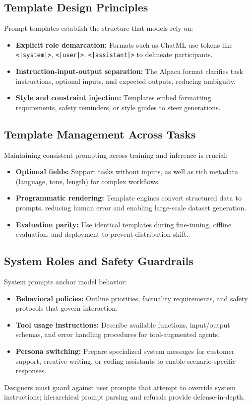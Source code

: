 \documentclass{article}
\begin{document}
\subsection{Template Design Principles}
Prompt templates establish the structure that models rely on:
\begin{itemize}
  \item \textbf{Explicit role demarcation:} Formats such as ChatML use tokens like \texttt{<|system|>}, \texttt{<|user|>}, \texttt{<|assistant|>} to delineate participants.
  \item \textbf{Instruction-input-output separation:} The Alpaca format clarifies task instructions, optional inputs, and expected outputs, reducing ambiguity.
  \item \textbf{Style and constraint injection:} Templates embed formatting requirements, safety reminders, or style guides to steer generations.
\end{itemize}

\subsection{Template Management Across Tasks}
Maintaining consistent prompting across training and inference is crucial:
\begin{itemize}
  \item \textbf{Optional fields:} Support tasks without inputs, as well as rich metadata (language, tone, length) for complex workflows.
  \item \textbf{Programmatic rendering:} Template engines convert structured data to prompts, reducing human error and enabling large-scale dataset generation.
  \item \textbf{Evaluation parity:} Use identical templates during fine-tuning, offline evaluation, and deployment to prevent distribution shift.
\end{itemize}

\subsection{System Roles and Safety Guardrails}
System prompts anchor model behavior:
\begin{itemize}
  \item \textbf{Behavioral policies:} Outline priorities, factuality requirements, and safety protocols that govern interaction.
  \item \textbf{Tool usage instructions:} Describe available functions, input/output schemas, and error handling procedures for tool-augmented agents.
  \item \textbf{Persona switching:} Prepare specialized system messages for customer support, creative writing, or coding assistants to enable scenario-specific responses.
\end{itemize}
Designers must guard against user prompts that attempt to override system instructions; hierarchical prompt parsing and refusals provide defense-in-depth.
\end{document}
